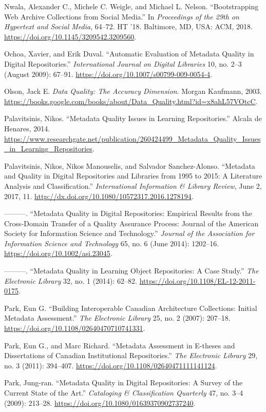 Nwala, Alexander C., Michele C. Weigle, and Michael L. Nelson. “Bootstrapping Web Archive Collections from Social Media.” In \emph{Proceedings of the 29th on Hypertext and Social Media}, 64–72. HT ’18. Baltimore, MD, USA: ACM, 2018. \url{https://doi.org/10.1145/3209542.3209560}.

Ochoa, Xavier, and Erik Duval. “Automatic Evaluation of Metadata Quality in Digital Repositories.” \emph{International Journal on Digital Libraries} 10, no. 2–3 (August 2009): 67–91. \url{https://doi.org/10.1007/s00799-009-0054-4}.

Olson, Jack E. \emph{Data Quality: The Accuracy Dimension}. Morgan Kaufmann, 2003. \url{https://books.google.com/books/about/Data_Quality.html?id=x8ahL57VOtcC}.

Palavitsinis, Nikos. “Metadata Quality Issues in Learning Repositories.” Alcala de Henares, 2014. \url{https://www.researchgate.net/publication/260424499_Metadata_Quality_Issues_in_Learning_Repositories}.

Palavitsinis, Nikos, Nikos Manouselis, and Salvador Sanchez-Alonso. “Metadata and Quality in Digital Repositories and Libraries from 1995 to 2015: A Literature Analysis and Classification.” \emph{International Information \& Library Review}, June 2, 2017, 11. \url{http://dx.doi.org/10.1080/10572317.2016.1278194}.

———. “Metadata Quality in Digital Repositories: Empirical Results from the Cross-Domain Transfer of a Quality Assurance Process: Journal of the American Society for Information Science and Technology.” \emph{Journal of the Association for Information Science and Technology} 65, no. 6 (June 2014): 1202–16. \url{https://doi.org/10.1002/asi.23045}.

———. “Metadata Quality in Learning Object Repositories: A Case Study.” \emph{The Electronic Library} 32, no. 1 (2014): 62–82. \url{https://doi.org/10.1108/EL-12-2011-0175}.

Park, Eun G. “Building Interoperable Canadian Architecture Collections: Initial Metadata Assessment.” \emph{The Electronic Library} 25, no. 2 (2007): 207–18. \url{https://doi.org/10.1108/02640470710741331}.

Park, Eun G., and Marc Richard. “Metadata Assessment in E-theses and Dissertations of Canadian Institutional Repositories.” \emph{The Electronic Library} 29, no. 3 (2011): 394–407. \url{https://doi.org/10.1108/02640471111141124}.

Park, Jung-ran. “Metadata Quality in Digital Repositories: A Survey of the Current State of the Art.” \emph{Cataloging \& Classification Quarterly} 47, no. 3–4 (2009): 213–28. \url{https://doi.org/10.1080/01639370902737240}.

